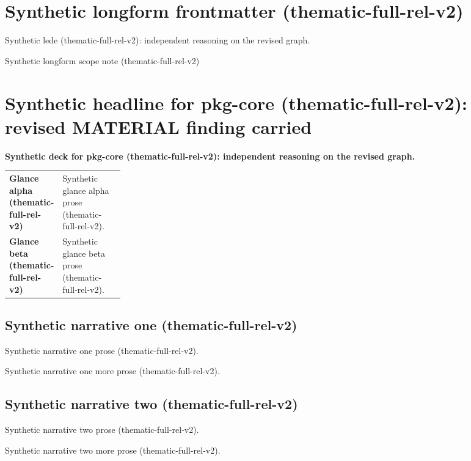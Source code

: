 \documentclass[lualatex,a4paper,10pt]{jlreq}
\begin{document}
\surveycover
\clearpage
\section*{Synthetic longform frontmatter (thematic-full-rel-v2)}
Synthetic lede (thematic-full-rel-v2): independent reasoning on the revised graph.

\begin{claimboundary}
\noindent Synthetic longform scope note (thematic-full-rel-v2)\par
\end{claimboundary}
\medskip
\tableofcontents
\clearpage
\Needspace{0.24\textheight}
\section{Synthetic headline for pkg-core (thematic-full-rel-v2): revised MATERIAL finding carried}
\label{pkg:pkg-core}
\noindent\textbf{Synthetic deck for pkg-core (thematic-full-rel-v2): independent reasoning on the revised graph.} \cite{sp001lnd001}\par\medskip
\begin{themeoverview}
\begin{tabularx}{\linewidth}{@{}>{\bfseries}p{0.22\linewidth}X@{}}
Glance alpha (thematic-full-rel-v2) & Synthetic glance alpha prose (thematic-full-rel-v2). \cite{sp001lnd001} \\
Glance beta (thematic-full-rel-v2) & Synthetic glance beta prose (thematic-full-rel-v2). \cite{sp001lnd001} \\
\end{tabularx}
\end{themeoverview}
\medskip
\begin{multicols}{2}
\subsection*{Synthetic narrative one (thematic-full-rel-v2)}
\noindent Synthetic narrative one prose (thematic-full-rel-v2). \cite{sp001lnd001}\par\medskip
\noindent Synthetic narrative one more prose (thematic-full-rel-v2). \cite{sp001lnd001}\par\medskip
\subsection*{Synthetic narrative two (thematic-full-rel-v2)}
\noindent Synthetic narrative two prose (thematic-full-rel-v2). \cite{sp001lnd001}\par\medskip
\noindent Synthetic narrative two more prose (thematic-full-rel-v2). \cite{sp001lnd001}\par\medskip
\end{multicols}
\end{document}
